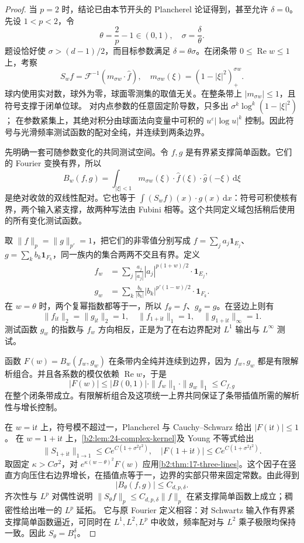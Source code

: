 \begin{proof}
当 \(p=2\) 时，结论已由本节开头的 Plancherel 论证得到，甚至允许 \(\delta=0\)。先设 \(1<p<2\)，令
\[
 \theta=\frac2p-1\in(0,1),\quad
 \sigma=\frac\delta\theta.
\]
题设恰好使 \(\sigma>(d-1)/2\)，而目标参数满足 \(\delta=\theta\sigma\)。在闭条带 \(0\leq\operatorname{Re}w\leq1\) 上，考察
\[
 S_wf=\mathcal F^{-1}(m_{\sigma w}\cdot\widehat f),
 \quad
 m_{\sigma w}(\xi)=(1-|\xi|^2)_+^{\sigma w}.
\]
球内使用实对数，球外为零，球面零测集的取值无关。在整条带上
\(|m_{\sigma w}|\leq1\)，且符号支撑于闭单位球。
对内点参数的任意固定阶导数，只多出
\(\sigma^k\log^k(1-|\xi|^2)\)；
在参数紧集上，其绝对积分由球面法向变量中可积的
\(u^\varepsilon|\log u|^k\) 控制。因此符号与光滑频率测试函数的配对全纯，并连续到两条边界。

先明确一套可随参数变化的共同测试空间。令 \(f,g\) 是有界紧支撑简单函数。它们的 Fourier 变换有界，所以
\[
 B_w(f,g)=\int_{|\xi|<1}
 m_{\sigma w}(\xi)\cdot\widehat f(\xi)
 \cdot\widehat g(-\xi)\,\mathrm d\xi
\]
是绝对收敛的双线性配对。它也等于
\(\int(S_wf)(x)\cdot g(x)\,\mathrm dx\)：符号可积使核有界，两个输入紧支撑，故两种写法由 Fubini 相等。这个共同定义域包括稍后使用的所有变化测试函数。

取 \(\|f\|_p=\|g\|_{p'}=1\)，把它们的非零值分别写成
\(f=\sum_j a_j\mathbf1_{E_j}\)、
\(g=\sum_k b_k\mathbf1_{F_k}\)，同一族内的集合两两不交且有界。定义
\[
 \begin{aligned}
 f_w&=\sum_j\frac{a_j}{|a_j|}
 |a_j|^{p(1+w)/2}\cdot\mathbf1_{E_j},\\
 g_w&=\sum_k\frac{b_k}{|b_k|}
 |b_k|^{p'(1-w)/2}\cdot\mathbf1_{F_k}.
 \end{aligned}
\]
在 \(w=\theta\) 时，两个复幂指数都等于一，所以
\(f_\theta=f\)、\(g_\theta=g\)。在竖边上则有
\[
 \|f_{\mathrm it}\|_2=\|g_{\mathrm it}\|_2=1,\quad
 \|f_{1+\mathrm it}\|_1=1,\quad
 \|g_{1+\mathrm it}\|_\infty=1.
\]
测试函数 \(g_w\) 的指数与 \(f_w\) 方向相反，正是为了在右边界配对 \(L^1\) 输出与 \(L^\infty\) 测试。

函数 \(F(w)=B_w(f_w,g_w)\) 在条带内全纯并连续到边界，因为 \(f_w,g_w\) 都是有限解析组合。并且各系数的模仅依赖 \(\operatorname{Re}w\)，于是
\[
 |F(w)|\leq |B(0,1)|\cdot
 \|f_w\|_1\cdot\|g_w\|_1\leq C_{f,g}
\]
在整个闭条带成立。有限解析组合及这项统一上界共同保证了条带插值所需的解析性与增长控制。

在 \(w=\mathrm it\) 上，符号模不超过一，Plancherel 与 Cauchy--Schwarz 给出
\(|F(\mathrm it)|\leq1\)。
在 \(w=1+\mathrm it\) 上，\cref{b2:lem:24-complex-kernel}及 Young 不等式给出
\[
 \|S_{1+\mathrm it}\|_{1\to1}
 \leq C e^{C(1+\sigma^2t^2)},
 \quad
 |F(1+\mathrm it)|\leq C e^{C(1+\sigma^2t^2)}.
\]
取固定 \(\kappa>C\sigma^2\)，对
\(e^{\kappa(w-\theta)^2}F(w)\)
应用\cref{b2:thm:17-three-lines}。这个因子在竖直方向压住右边界增长，在插值点等于一，边界的实部只带来固定常数。由此得到
\[
 |B_\theta(f,g)|\leq C_{d,p,\delta}.
\]
齐次性与 \(L^p\) 对偶性说明
\(\|S_\theta f\|_p\leq C_{d,p,\delta}\|f\|_p\)
在紧支撑简单函数上成立；稠密性给出唯一的 \(L^p\) 延拓。
它与原 Fourier 定义相容：对 Schwartz 输入作有界紧支撑简单函数逼近，可同时在 \(L^1,L^2,L^p\) 中收敛，频率配对与 \(L^2\) 乘子极限均保持一致。因此 \(S_\theta=B_1^\delta\)。


\end{proof}
